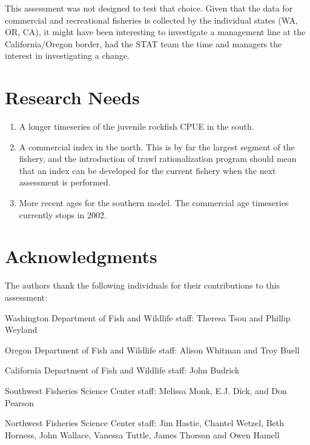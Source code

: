 \documentclass[12pt,]{article}
\begin{document}
This assessment was not designed to test that choice. Given that the
data for commercial and recreational fisheries is collected by the
individual states (WA, OR, CA), it might have been interesting to
investigate a management line at the California/Oregon border, had the
STAT team the time and managers the interest in investigating a change.

\newpage

\section{Research Needs}\label{research-needs}

\begin{enumerate}

\item A longer timeseries of the juvenile rockfish CPUE in the south.

\item A commercial index in the north.  This is by far the largest segment of the fishery, and the introduction of trawl rationalization program should mean that an index can be developed for the current fishery when the next assessment is performed.

\item More recent ages for the southern model.  The commercial age timeseries currently stops in 2002.

\end{enumerate}

\newpage

\section{Acknowledgments}\label{acknowledgments}

The authors thank the following individuals for their contributions to
this assessment:

Washington Department of Fish and Wildlife staff: Theresa Tsou and
Phillip Weyland

Oregon Department of Fish and Wildlife staff: Alison Whitman and Troy
Buell

California Department of Fish and Wildlife staff: John Budrick

Southwest Fisheries Science Center staff: Melissa Monk, E.J. Dick, and
Don Pearson

Northwest Fisheries Science Center staff: Jim Hastie, Chantel Wetzel,
Beth Horness, John Wallace, Vanessa Tuttle, James Thorson and Owen
Hamell
\end{document}
